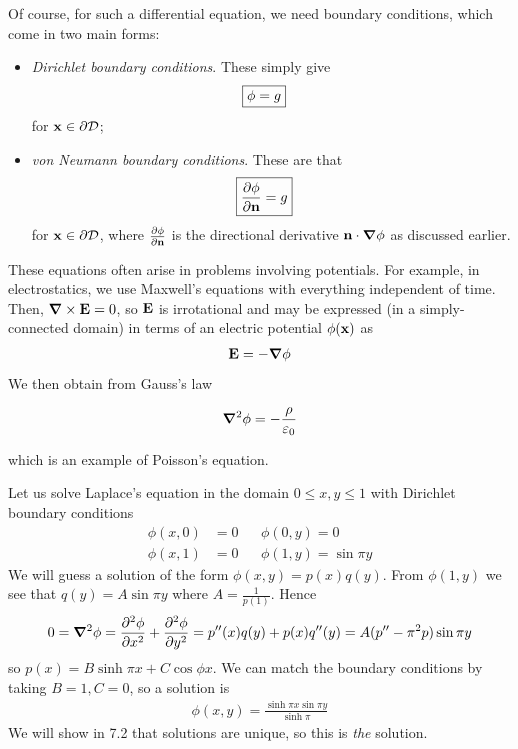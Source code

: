 \documentclass{../../template/note}
\begin{document}
    Of course, for such a differential equation, we need boundary conditions, which come in two main forms:
    \begin{itemize}
        \item \emph{Dirichlet boundary conditions}. These simply give
        \begin{align*}
            \Aboxed{\phi = g}
        \end{align*}
        for \(\V x \in \pr \mc D\);
        \item \emph{von Neumann boundary conditions}. These are that
        \begin{align*}
            \Aboxed{\pd{\phi}{\V n} = g}
        \end{align*}
        for \(\V x \in \pr \mc D\), where \(\pd{\phi}{\V n}\) is the directional derivative \(\V n \cdot \grad \phi\) as discussed earlier.        
    \end{itemize}
    
    These equations often arise in problems involving potentials. For example, in electrostatics, we use Maxwell's equations with everything independent of time. Then, \(\curl \V E = 0\), so \(\V E\) is irrotational and may be expressed (in a simply-connected domain) in terms of an electric potential \(\phi(\V x)\) as
    \begin{align*}
        \V E = -\grad \phi
    \end{align*}
    We then obtain from Gauss's law
    \begin{proposition}
        \label{7.1}
        \[
            \grad^2 \phi = -\frac \rho {\eps_0}
        \]
    \end{proposition}
    which is an example of Poisson's equation.
    
    \begin{example*}
        Let us solve Laplace's equation in the domain \(0 \leq x, y \leq 1\) with Dirichlet boundary conditions
        \begin{align*}
            \phi(x, 0) &= 0 && \phi(0, y) = 0 \\
            \phi(x, 1) &= 0 && \phi(1, y) = \sin{\pi y}
        \end{align*}
        We will guess a solution of the form \(\phi(x, y) = p(x)q(y)\). From \(\phi(1, y)\) we see that \(q(y) = A \sin{\pi y}\) where \(A = \frac 1 {p(1)}\). Hence
        \begin{align*}
            0 = \grad^2 \phi = \pd{^2\phi}{x^2} + \pd{^2\phi}{y^2} = p''(x)q(y) + p(x)q''(y) = A(p''-\pi^2p) \sin{\pi y}
        \end{align*}
        so \(p(x) = B \sinh \pi x + C \cos \phi x\). We can match the boundary conditions by taking \(B = 1, C = 0\), so a solution is
        \begin{align*}
            \phi(x, y) = \frac{\sinh \pi x \sin \pi y}{\sinh \pi}
        \end{align*}
        We will show in 7.2 that solutions are unique, so this is \emph{the} solution.
    \end{example*}
    
\end{document}
